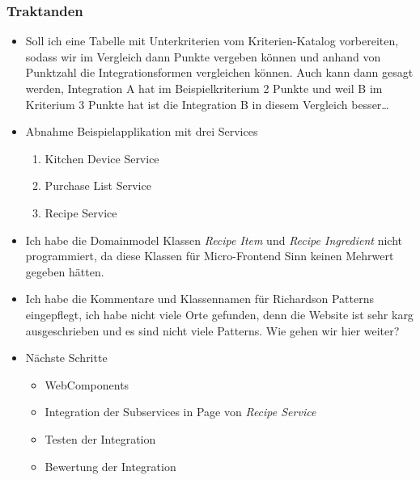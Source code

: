 \documentclass{article}
\begin{document}
\subsubsection{Traktanden}
\begin{itemize}
    \item Soll ich eine Tabelle mit Unterkriterien vom Kriterien-Katalog vorbereiten, sodass wir im Vergleich dann Punkte vergeben können und anhand von Punktzahl die Integrationsformen vergleichen können. Auch kann dann gesagt werden, Integration A hat im Beispielkriterium 2 Punkte und weil B im Kriterium 3 Punkte hat ist die Integration B in diesem Vergleich besser\ldots
    \item Abnahme Beispielapplikation mit drei Services
    \begin{enumerate}
        \item Kitchen Device Service
        \item Purchase List Service
        \item Recipe Service
    \end{enumerate}
    \item Ich habe die Domainmodel Klassen \textit{Recipe Item} und \textit{Recipe Ingredient} nicht programmiert, da diese Klassen für Micro-Frontend Sinn keinen Mehrwert gegeben hätten.
    \item Ich habe die Kommentare und Klassennamen für Richardson Patterns eingepflegt, ich habe nicht viele Orte gefunden, denn die Website ist sehr karg ausgeschrieben und es sind nicht viele Patterns. Wie gehen wir hier weiter?
    \item Nächste Schritte
    \begin{itemize}
        \item WebComponents
        \item Integration der Subservices in Page von \textit{Recipe Service}
        \item Testen der Integration
        \item Bewertung der Integration
    \end{itemize}
\end{itemize}
\end{document}
